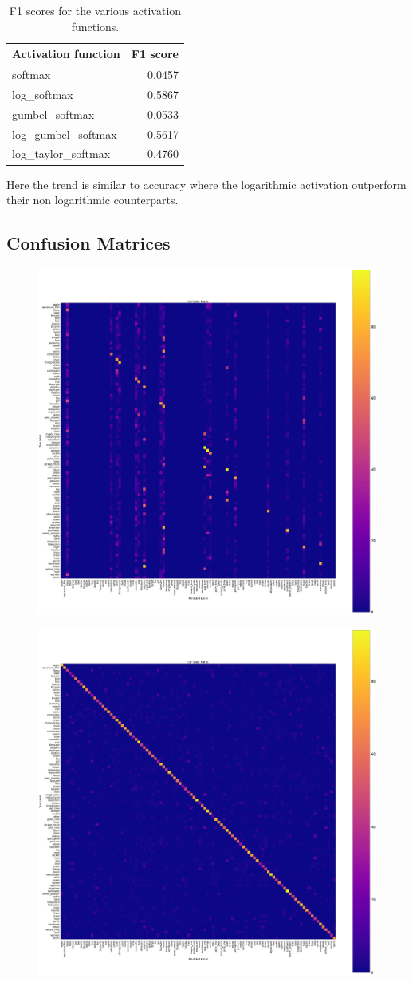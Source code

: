 \documentclass{article}
\begin{document}
\begin{table}[h]
\centering
\begin{tabular}{l|r}
Activation function & F1 score \\\hline
softmax & 0.0457 \\
log\_softmax & 0.5867 \\
gumbel\_softmax & 0.0533 \\
log\_gumbel\_softmax & 0.5617 \\
log\_taylor\_softmax & 0.4760 
\end{tabular}
\caption{\label{tab:widgets}F1 scores for the various activation functions.}
\end{table}
\noindent
Here the trend is similar to accuracy where the logarithmic activation outperform their non logarithmic counterparts.

\newpage
\subsection{Confusion Matrices}
\begin{figure}[h]
\centering
\begin{minipage}{.5\textwidth}
  \centering
  \includegraphics[width=.6\linewidth]{assets/softmax_cm.png}
  \newline
  \noindent
  \label{fig:test1}
\end{minipage}%
\begin{minipage}{.5\textwidth}
  \centering
  \includegraphics[width=.6\linewidth]{assets/log_softmax_cm.png}
  \newline
  \noindent
  \label{fig:test2}
\end{minipage}
\end{figure}
\end{document}
